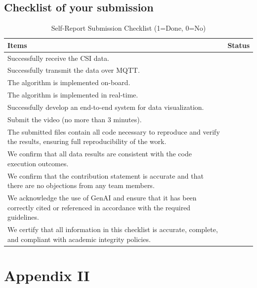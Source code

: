 \subsection{Checklist of your submission}

\begin{table}[!h]
\caption{Self-Report Submission Checklist (1=Done, 0=No)}
\label{tab:checklist}
\begin{tabularx}{\textwidth}{L C}
\toprule
\textbf{Items} & \textbf{Status} \\
\midrule

Successfully receive the CSI data. & \underline{\hspace{1em}} \\
Successfully transmit the data over MQTT. & \underline{\hspace{1em}} \\
The algorithm is implemented on-board. & \underline{\hspace{1em}} \\
The algorithm is implemented in real-time. & \underline{\hspace{1em}} \\
Successfully develop an end-to-end system for data visualization. & \underline{\hspace{1em}} \\
\midrule

Submit the video (no more than 3 minutes). & \underline{\hspace{1em}} \\
The submitted files contain all code necessary to reproduce and verify the results, ensuring full reproducibility of the work. & \underline{\hspace{1em}} \\
\midrule

We confirm that all data results are consistent with the code execution outcomes. & \underline{\hspace{1em}} \\
We confirm that the contribution statement is accurate and that there are no objections from any team members. & \underline{\hspace{1em}} \\
We acknowledge the use of GenAI and ensure that it has been correctly cited or referenced in accordance with the required guidelines. & \underline{\hspace{1em}} \\
We certify that all information in this checklist is accurate, complete, and compliant with academic integrity policies. & \underline{\hspace{1em}} \\

\bottomrule
\end{tabularx}
\end{table}
\section{Appendix II}


